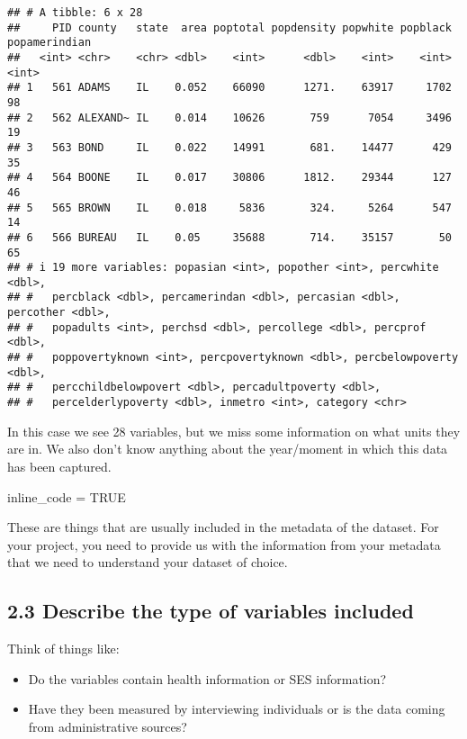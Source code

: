 \documentclass[
]{article}
\newenvironment{Shaded}{\begin{snugshade}}{\end{snugshade}}
\newcommand{\ConstantTok}[1]{\textcolor[rgb]{0.56,0.35,0.01}{#1}}
\newcommand{\NormalTok}[1]{#1}
\newcommand{\OtherTok}[1]{\textcolor[rgb]{0.56,0.35,0.01}{#1}}
\begin{document}
\begin{verbatim}
## # A tibble: 6 x 28
##     PID county   state  area poptotal popdensity popwhite popblack popamerindian
##   <int> <chr>    <chr> <dbl>    <int>      <dbl>    <int>    <int>         <int>
## 1   561 ADAMS    IL    0.052    66090      1271.    63917     1702            98
## 2   562 ALEXAND~ IL    0.014    10626       759      7054     3496            19
## 3   563 BOND     IL    0.022    14991       681.    14477      429            35
## 4   564 BOONE    IL    0.017    30806      1812.    29344      127            46
## 5   565 BROWN    IL    0.018     5836       324.     5264      547            14
## 6   566 BUREAU   IL    0.05     35688       714.    35157       50            65
## # i 19 more variables: popasian <int>, popother <int>, percwhite <dbl>,
## #   percblack <dbl>, percamerindan <dbl>, percasian <dbl>, percother <dbl>,
## #   popadults <int>, perchsd <dbl>, percollege <dbl>, percprof <dbl>,
## #   poppovertyknown <int>, percpovertyknown <dbl>, percbelowpoverty <dbl>,
## #   percchildbelowpovert <dbl>, percadultpoverty <dbl>,
## #   percelderlypoverty <dbl>, inmetro <int>, category <chr>
\end{verbatim}

In this case we see 28 variables, but we miss some information on what
units they are in. We also don't know anything about the year/moment in
which this data has been captured.

\begin{Shaded}
\begin{Highlighting}[]
\NormalTok{inline\_code }\OtherTok{=} \ConstantTok{TRUE}
\end{Highlighting}
\end{Shaded}

These are things that are usually included in the metadata of the
dataset. For your project, you need to provide us with the information
from your metadata that we need to understand your dataset of choice.

\subsection{2.3 Describe the type of variables
included}\label{describe-the-type-of-variables-included}

Think of things like:

\begin{itemize}
\item
  Do the variables contain health information or SES information?
\item
  Have they been measured by interviewing individuals or is the data
  coming from administrative sources?
\end{itemize}
\end{document}
